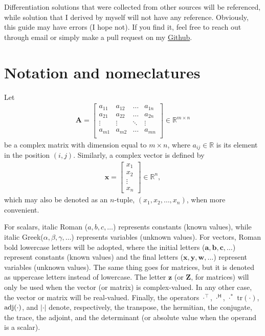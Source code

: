 \documentclass{article}
\newcommand{\trans}{\top}
\newcommand{\hermit}{\mathsf{H}}
\newcommand\abs[1]{\left\lvert#1\right\rvert}
\begin{document}
Differentiation solutions that were collected from other sources will be referenced, while solution that I derived by myself will not have any reference. Obviously, this guide may have errors (I hope not). If you find it, feel free to reach out through email or simply make a pull request on my \href{https://github.com/tapyu/tapyu.github.io/tree/master/notes/posts/matrix_diff_ref/latex}{Github}.

\section{Notation and nomeclatures}
\label{sec:notation}

Let
\begin{align}
    \mathbf{A} = \begin{bmatrix}
        a_{11} & a_{12} & \dots & a_{1n} \\
        a_{21} & a_{22} & \dots & a_{2n} \\
        \vdots & \vdots & \ddots & \vdots \\
        a_{m1} & a_{m2} & \dots & a_{mn} \\
    \end{bmatrix} \in \mathbb{R}^{m \times n}
\end{align}
be a complex matrix with dimension equal to \(m \times n\), where \(a_{ij} \in \mathbb{R}\) is its element in the position \((i,j)\). Similarly, a complex vector is defined by
\begin{align}
    \mathbf{x} = \begin{bmatrix}
        x_1 \\
        x_2 \\
        \vdots \\
        x_n
    \end{bmatrix}  \in \mathbb{R}^{n},
\end{align}
which may also be denoted as an \(n\)-tuple, \((x_1, x_2, \dots, x_n)\), when more convenient.

For scalars, italic Roman (\(a,b,c,\dots\)) represents constants (known values), while italic Greek\linebreak (\(\alpha, \beta, \gamma, \dots\)) represents variables (unknown values). For vectors, Roman bold lowercase letters will be adopted, where the initial letters (\(\mathbf{a}, \mathbf{b}, \mathbf{c}, \dots\)) represent constants (known values) and the final letters (\(\mathbf{x}, \mathbf{y}, \mathbf{w}, \dots\)) represent variables (unknown values). The same thing goes for matrices, but it is denoted as uppercase letters instead of lowercase. The letter \(\mathbf{z}\) (or \(\mathbf{Z}\), for matrices) will only be used when the vector (or matrix) is complex-valued. In any other case, the vector or matrix will be real-valued. Finally, the operators \(\cdot^{\trans}\), \(\cdot^{\hermit}\), \(\cdot^*\) \(\text{tr}(\cdot)\), \(\textnormal{adj}(\cdot)\), and \(\abs{\cdot}\) denote, respectively, the transpose, the hermitian, the conjugate, the trace, the adjoint, and the determinant (or absolute value when the operand is a scalar).
\end{document}
